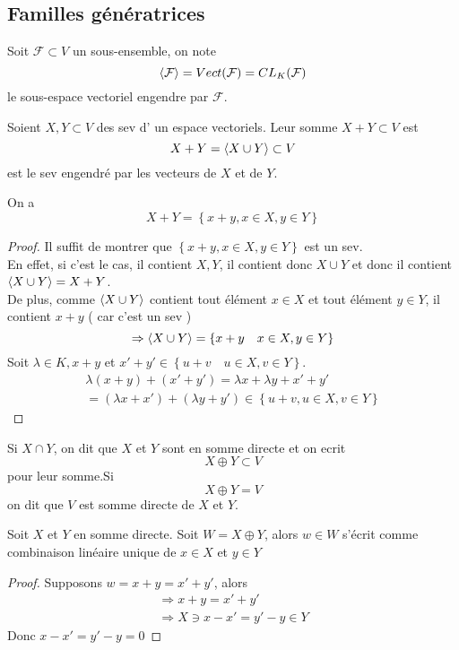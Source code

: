 \documentclass[../main.tex]{subfiles}
\begin{document}
\subsection{Familles génératrices}
\begin{defn}
Soit $ \mathcal{F}\subset V$ un sous-ensemble, on note
\[ 
	\left\langle \mathcal{F}\right\rangle = Vect( \mathcal{F}) = CL_K( \mathcal{F})
\]
le sous-espace vectoriel engendre par $ \mathcal{F}$.
\end{defn}
\begin{defn}
Soient $X,Y\subset V$ des sev d' un espace vectoriels. Leur somme $X+Y\subset V$ est
\[ 
	X+Y = \left\langle X\cup Y\right\rangle \subset V
\]
est le sev engendré par les vecteurs de $X$ et de $Y$.
\end{defn}
\begin{lemma}
On a 
\[ 
X+Y = \left\{ x+y, x\in X, y \in Y \right\} 
\]

\end{lemma}
\begin{proof}
Il suffit de montrer que $ \left\{ x+y ,    x\in X, y\in Y \right\} $ est un sev.\\
En effet, si c'est le cas, il contient $X,Y$, il contient donc $X\cup Y$ et donc il contient $ \left\langle X\cup Y\right\rangle= X+Y$.\\
De plus, comme $\left\langle X\cup Y\right\rangle$ contient tout élément $x\in X$ et tout élément $y\in Y$, il contient $x+y$ ( car c'est un sev )
\[ 
	\Rightarrow \left\langle X\cup Y\right\rangle = \left\{ x+y\quad x\in X, y \in Y \right\} 
\]
Soit $\lambda\in K, x+y $ et $ x'+y'\in \left\{ u+v\quad u\in X, v\in Y \right\} $.
\begin{align*}
\lambda(x+y) + ( x'+y')= \lambda x +\lambda y + x' + y'\\
= ( \lambda x + x') + ( \lambda y + y') \in \left\{ u+v, u \in X, v \in Y \right\} 
\end{align*}
	
\end{proof}
\begin{defn}[Notations]
	Si $X\cap Y$, on dit que $X$ et $Y$ sont en somme directe et on ecrit
	\[ 
	X \oplus Y \subset V
	\]
	pour leur somme.Si
	\[ 
	X \oplus Y =V
	\]
	on dit que $V$ est somme directe de $X$ et $Y$.

\end{defn}

\begin{propo}
Soit $X$ et $Y$ en somme directe. Soit $W=X\oplus Y$, alors $w \in W$ s'écrit comme combinaison linéaire unique de $x\in X$ et $y\in Y$
\end{propo}
\begin{proof}
Supposons $w=x+y= x'+y'$, alors
 \begin{align*}
\Rightarrow x+y=x'+y'\\
\Rightarrow X\ni x-x' = y'-y \in Y
\end{align*}
Donc $x-x'=y'-y =0$
\end{proof}
\end{document}
